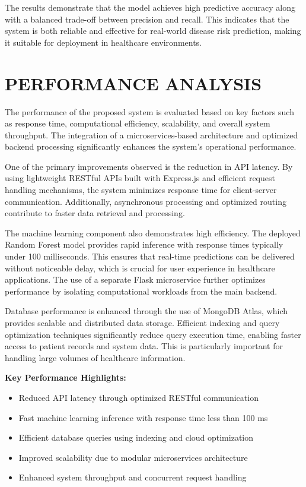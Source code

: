 \documentclass[conference]{IEEEtran}
\begin{document}
The results demonstrate that the model achieves high predictive accuracy along with a balanced trade-off between precision and recall. This indicates that the system is both reliable and effective for real-world disease risk prediction, making it suitable for deployment in healthcare environments.
 
\section{PERFORMANCE ANALYSIS}

The performance of the proposed system is evaluated based on key factors such as response time, computational efficiency, scalability, and overall system throughput. The integration of a microservices-based architecture and optimized backend processing significantly enhances the system’s operational performance.

One of the primary improvements observed is the reduction in API latency. By using lightweight RESTful APIs built with Express.js and efficient request handling mechanisms, the system minimizes response time for client-server communication. Additionally, asynchronous processing and optimized routing contribute to faster data retrieval and processing.

The machine learning component also demonstrates high efficiency. The deployed Random Forest model provides rapid inference with response times typically under 100 milliseconds. This ensures that real-time predictions can be delivered without noticeable delay, which is crucial for user experience in healthcare applications. The use of a separate Flask microservice further optimizes performance by isolating computational workloads from the main backend.

Database performance is enhanced through the use of MongoDB Atlas, which provides scalable and distributed data storage. Efficient indexing and query optimization techniques significantly reduce query execution time, enabling faster access to patient records and system data. This is particularly important for handling large volumes of healthcare information.

\textbf{Key Performance Highlights:}
\begin{itemize}
\item Reduced API latency through optimized RESTful communication
\item Fast machine learning inference with response time less than 100 ms
\item Efficient database queries using indexing and cloud optimization
\item Improved scalability due to modular microservices architecture
\item Enhanced system throughput and concurrent request handling
\end{itemize}
\end{document}
